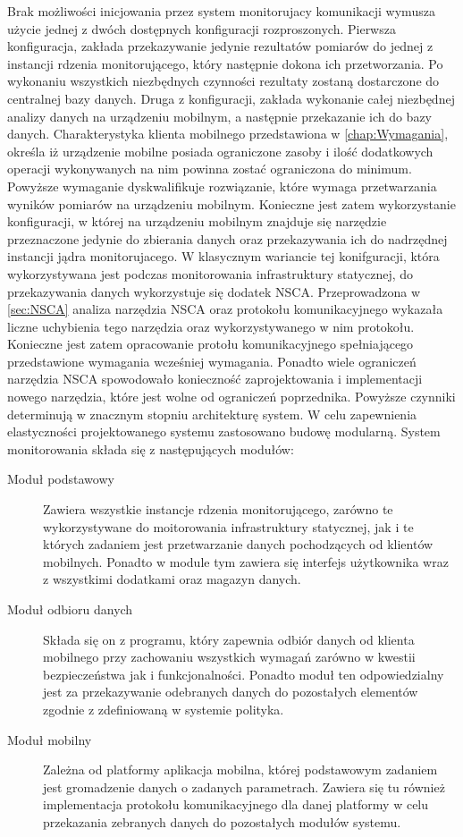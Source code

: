 Brak możliwości inicjowania przez system monitorujacy komunikacji
wymusza użycie jednej z dwóch dostępnych konfiguracji
rozproszonych. Pierwsza konfiguracja, zakłada przekazywanie jedynie
rezultatów pomiarów do jednej z instancji rdzenia monitorującego,
który następnie dokona ich przetworzania. Po wykonaniu wszystkich
niezbędnych czynności rezultaty zostaną dostarczone do centralnej bazy
danych. Druga z konfiguracji, zakłada wykonanie całej niezbędnej
analizy danych na urządzeniu mobilnym, a następnie przekazanie ich do
bazy danych. Charakterystyka klienta mobilnego przedstawiona w
\ref{chap:Wymagania}, określa iż urządzenie mobilne posiada
ograniczone zasoby i ilość dodatkowych operacji wykonywanych na nim
powinna zostać ograniczona do minimum. Powyższe wymaganie
dyskwalifikuje rozwiązanie, które wymaga przetwarzania wyników
pomiarów na urządzeniu mobilnym. Konieczne jest zatem wykorzystanie
konfiguracji, w której na urządzeniu mobilnym znajduje się narzędzie
przeznaczone jedynie do zbierania danych oraz przekazywania ich do
nadrzędnej instancji jądra monitorujacego. W klasycznym wariancie tej
konifguracji, która wykorzystywana jest podczas monitorowania
infrastruktury statycznej, do przekazywania danych wykorzystuje się
dodatek NSCA. Przeprowadzona w \ref{sec:NSCA} analiza narzędzia NSCA
oraz protokołu komunikacyjnego wykazała liczne uchybienia tego
narzędzia oraz wykorzystywanego w nim protokołu. Konieczne jest
zatem opracowanie protołu komunikacyjnego spełniającego przedstawione
wymagania wcześniej wymagania. Ponadto wiele ograniczeń narzędzia NSCA
spowodowało konieczność zaprojektowania i implementacji nowego
narzędzia, które jest wolne od ograniczeń poprzednika. Powyższe
czynniki determinują w znacznym stopniu architekturę system. W celu
zapewnienia elastyczności projektowanego systemu zastosowano budowę
modularną. System monitorowania składa się z następujących modułów:

\begin{description}
\item[Moduł podstawowy] Zawiera wszystkie instancje rdzenia
  monitorującego, zarówno te wykorzystywane do moitorowania
  infrastruktury statycznej, jak i te których zadaniem jest
  przetwarzanie danych pochodzących od klientów mobilnych. Ponadto w
  module tym zawiera się interfejs użytkownika wraz z wszystkimi
  dodatkami oraz magazyn danych.

\item[Moduł odbioru danych] Składa się on z programu, który zapewnia
  odbiór danych od klienta mobilnego przy zachowaniu wszystkich
  wymagań zarówno w kwestii bezpieczeństwa jak i
  funkcjonalności. Ponadto moduł ten odpowiedzialny jest za
  przekazywanie odebranych danych do pozostałych elementów zgodnie z
  zdefiniowaną w systemie polityka.

\item[Moduł mobilny] Zależna od platformy aplikacja mobilna, której
  podstawowym zadaniem jest gromadzenie danych o zadanych
  parametrach. Zawiera się tu również implementacja protokołu
  komunikacyjnego dla danej platformy w celu przekazania zebranych
  danych do pozostałych modułów systemu.
\end{description}


